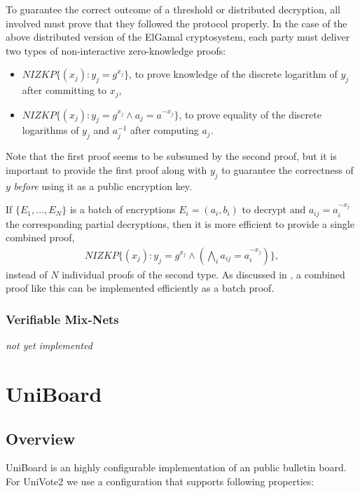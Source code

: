 \documentclass[bibtotoc,halfparskip,oneside]{scrreprt}
\begin{document}
To guarantee the correct outcome of a threshold or distributed decryption, all involved must prove that they followed the protocol properly. In the case of the above distributed version of the ElGamal cryptosystem, each party must deliver two types of non-interactive zero-knowledge proofs:
\begin{itemize}
\item $\mathit{NIZKP}\{(x_j):y_j=g^{x_j}\}$, to prove knowledge of the discrete logarithm of $y_j$ after committing to $x_j$,
\item $\mathit{NIZKP}\{(x_j):y_j=g^{x_j} \wedge a_j=a^{-x_j}\}$, to prove equality of the discrete logarithms of $y_j$ and $a_j^{-1}$ after computing $a_j$.
\end{itemize}
Note that the first proof seems to be subsumed by the second proof, but it is important to provide the first proof along with $y_j$ to guarantee the correctness of $y$ \emph{before} using it as a public encryption key.

If $\{E_1,\ldots,E_N\}$ is a batch of encryptions $E_i=(a_i,b_i)$ to decrypt and $a_{ij}=a_i^{-x_j}$ the corresponding partial decryptions, then it is more efficient to provide a single combined  proof,
\begin{align}
\mathit{NIZKP}\{(x_j):y_j=g^{x_j} \wedge (\bigwedge_i a_{ij}=a_i^{-x_j})\},
\end{align}
instead of $N$ individual proofs of the second type. As discussed in , a combined proof like this can be implemented efficiently as a batch proof.

\subsection{Verifiable Mix-Nets}

\emph{not yet implemented}
\chapter{UniBoard}

\section{Overview}
UniBoard is an highly configurable implementation of an public bulletin board. For UniVote2 we use
a configuration that supports following properties:
\end{document}
